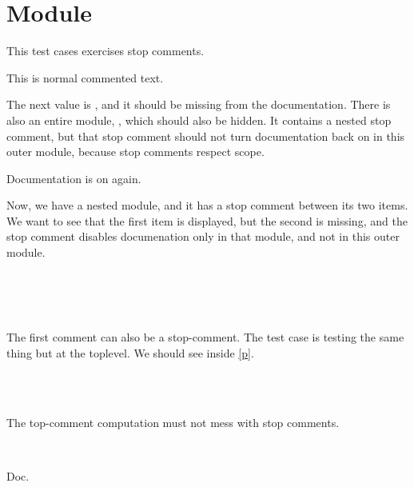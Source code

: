 \section{Module }\label{Stop}%
This test cases exercises stop comments.

\label{Stop-val-foo}\begin{ocamlindent}This is normal commented text.\end{ocamlindent}%
\medbreak
The next value is , and it should be missing from the documentation. There is also an entire module, , which should also be hidden. It contains a nested stop comment, but that stop comment should not turn documentation back on in this outer module, because stop comments respect scope.

Documentation is on again.

Now, we have a nested module, and it has a stop comment between its two items. We want to see that the first item is displayed, but the second is missing, and the stop comment disables documenation only in that module, and not in this outer module.

\label{Stop-module-N}\begin{ocamlindent}\label{Stop-N-val-quux}\\
\end{ocamlindent}%
\\
\label{Stop-val-lol}\\
The first comment can also be a stop-comment. The test case  is testing the same thing but at the toplevel. We should see  inside \hyperref[Stop-O]{[p\pageref*{Stop-O}]}.

\label{Stop-module-O}\begin{ocamlindent}\label{Stop-O-val-bar}\\
\end{ocamlindent}%
\\
The top-comment computation must not mess with stop comments.

\label{Stop-module-P}\begin{ocamlindent}\label{Stop-P-val-bar}\\
\end{ocamlindent}%
\begin{ocamlindent}Doc.\end{ocamlindent}%
\medbreak


